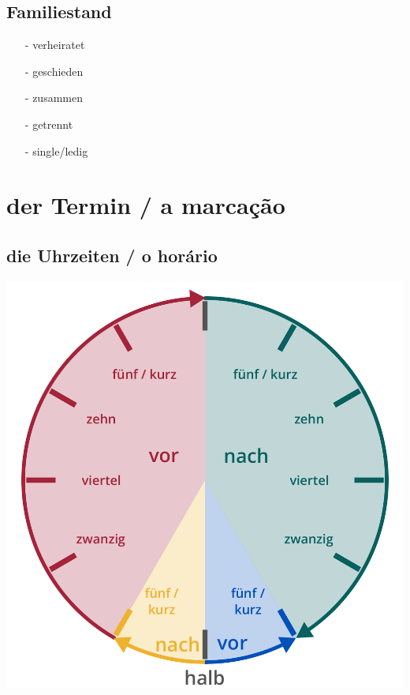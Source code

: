         \subsection{Familiestand}\label{subsection:deutsch:familie:familiestand}

            \begin{itemize}[before=\renewcommand{\baselinestretch}{1},topsep=0pt,itemsep=4pt,parsep=0pt]
                \item[-] verheiratet 
                \item[-] geschieden 
                \item[-] zusammen 
                \item[-] getrennt 
                \item[-] single/ledig 
            \end{itemize}

    \pagebreak\section{der Termin / a marcação}\label{section:deutsch:der_termin}
    
        \subsection{die Uhrzeiten / o horário}\label{subsection:deutsch:die_uhrzeiten}

            \centering\includegraphics[width=.5\linewidth]{figures/uhrzeiten.pdf}

